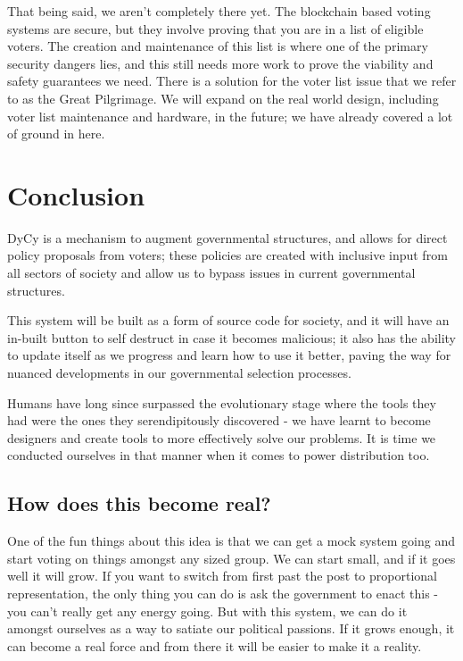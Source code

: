 \documentclass[twoside]{article}
\theoremstyle{definition}
\begin{document}
That being said, we aren’t completely there yet. The blockchain based voting systems are secure, but they involve proving that you are in a list of eligible voters. The creation and maintenance of this list is where one of the primary security dangers lies, and this still needs more work to prove the viability and safety guarantees we need. There is a solution for the voter list issue that we refer to as the Great Pilgrimage. We will expand on the real world design, including voter list maintenance and hardware, in the future; we have already covered a lot of ground in here.

\section{Conclusion}

DyCy is a mechanism to augment governmental structures, and allows for direct policy proposals from voters; these policies are created with inclusive input from all sectors of society and allow us to bypass issues in current governmental structures.

This system will be built as a form of source code for society, and it will have an in-built button to self destruct in case it becomes malicious; it also has the ability to update itself as we progress and learn how to use it better, paving the way for nuanced developments in our governmental selection processes.

Humans have long since surpassed the evolutionary stage where the tools they had were the ones they serendipitously discovered - we have learnt to become designers and create tools to more effectively solve our problems. It is time we conducted ourselves in that manner when it comes to power distribution too.

\subsection{How does this become real?}

One of the fun things about this idea is that we can get a mock system going and start voting on things amongst any sized group. We can start small, and if it goes well it will grow. If you want to switch from first past the post to proportional representation, the only thing you can do is ask the government to enact this - you can’t really get any energy going. But with this system, we can do it amongst ourselves as a way to satiate our political passions. If it grows enough, it can become a real force and from there it will be easier to make it a reality.
\end{document}
